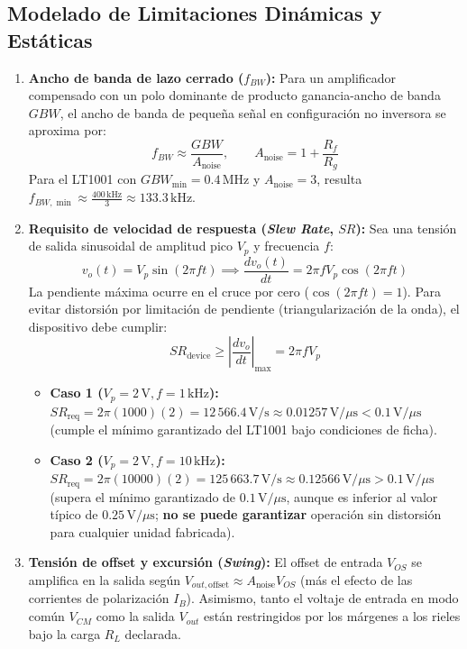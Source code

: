 \documentclass[11pt, a4paper]{article}
\begin{document}
\subsection{Modelado de Limitaciones Dinámicas y Estáticas}
\begin{enumerate}[noitemsep]
    \item \textbf{Ancho de banda de lazo cerrado ($f_{BW}$):} Para un amplificador compensado con un polo dominante de producto ganancia-ancho de banda $GBW$, el ancho de banda de pequeña señal en configuración no inversora se aproxima por:
    \begin{equation}
        f_{BW} \approx \frac{GBW}{A_{\text{noise}}}, \qquad A_{\text{noise}} = 1 + \frac{R_f}{R_g}
    \end{equation}
    Para el LT1001 con $GBW_{\min} = 0.4\,\text{MHz}$ y $A_{\text{noise}} = 3$, resulta $f_{BW,\min} \approx \frac{400\,\text{kHz}}{3} \approx 133.3\,\text{kHz}$.
    \item \textbf{Requisito de velocidad de respuesta (\textit{Slew Rate}, $SR$):} Sea una tensión de salida sinusoidal de amplitud pico $V_p$ y frecuencia $f$:
    \begin{equation}
        v_o(t) = V_p \sin(2\pi f t) \implies \frac{dv_o(t)}{dt} = 2\pi f V_p \cos(2\pi f t)
    \end{equation}
    La pendiente máxima ocurre en el cruce por cero ($\cos(2\pi f t) = 1$). Para evitar distorsión por limitación de pendiente (triangularización de la onda), el dispositivo debe cumplir:
    \begin{equation}
        SR_{\text{device}} \ge \left|\frac{dv_o}{dt}\right|_{\max} = 2\pi f V_p
    \end{equation}
    \begin{itemize}[noitemsep]
        \item \textbf{Caso 1 ($V_p = 2\,\text{V}, f = 1\,\text{kHz}$):} $SR_{\text{req}} = 2\pi(1000)(2) = 12\,566.4\,\text{V/s} \approx 0.01257\,\text{V/}\mu\text{s} < 0.1\,\text{V/}\mu\text{s}$ (cumple el mínimo garantizado del LT1001 bajo condiciones de ficha).
        \item \textbf{Caso 2 ($V_p = 2\,\text{V}, f = 10\,\text{kHz}$):} $SR_{\text{req}} = 2\pi(10000)(2) = 125\,663.7\,\text{V/s} \approx 0.12566\,\text{V/}\mu\text{s} > 0.1\,\text{V/}\mu\text{s}$ (supera el mínimo garantizado de $0.1\,\text{V/}\mu\text{s}$, aunque es inferior al valor típico de $0.25\,\text{V/}\mu\text{s}$; \textbf{no se puede garantizar} operación sin distorsión para cualquier unidad fabricada).
    \end{itemize}
    \item \textbf{Tensión de offset y excursión (\textit{Swing}):} El offset de entrada $V_{OS}$ se amplifica en la salida según $V_{out,\text{offset}} \approx A_{\text{noise}} V_{OS}$ (más el efecto de las corrientes de polarización $I_B$). Asimismo, tanto el voltaje de entrada en modo común $V_{CM}$ como la salida $V_{out}$ están restringidos por los márgenes a los rieles bajo la carga $R_L$ declarada.
\end{enumerate}
\end{document}
